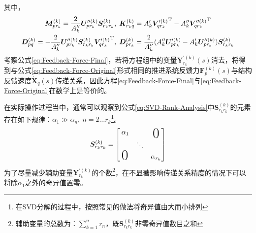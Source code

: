 其中，
\begin{displaymath}
	\begin{aligned}
		 \boldsymbol{M}_{pr_k}^{(k)}=\frac{2}{A''_k} \boldsymbol{U}_{pr_k}^{\prime\prime(k)} \boldsymbol{S}_{r_kr_k}^{(k)} &, \; \boldsymbol{K}_{r_kq}^{(k)}= {A'_k} {\boldsymbol{V}_{qr_k}^{\prime(k)}}^{\mathrm{T}}- {A''_k}{\boldsymbol{V}_{qr_k}^{\prime\prime(k)}}^{\mathrm{T}} \\ 
		 \boldsymbol{D}_{pq}^{(k)}=-\frac{2}{A''_k} \boldsymbol{U}_{pr_k}^{\prime\prime(k)} \boldsymbol{S}_{r_kr_k}^{(k)} {\boldsymbol{V}_{qr_k}^{\prime(k)}}^{\mathrm{T}} &, \; \boldsymbol{D}_{pr_k}^{(k)}=\frac{2}{A''_k}(A''_{k}\boldsymbol{U}_{pr_k}^{\prime(k)}- {A'_k}\boldsymbol{U}_{pr_k}^{\prime\prime(k)})\boldsymbol{S}_{r_kr_k}^{(k)}
	\end{aligned}
\end{displaymath}
考察公式\eqref{eq:Feedback-Force-Final}，若将方程组中的变量$\boldsymbol{Y}_{r_k}^{\prime(k)}(s)$消去，将得到与公式\eqref{eq:Feedback-Force-Original}形式相同的推进系统反馈力$\boldsymbol{F}_p^{(k)}(s)$与结构反馈速度$\dot{\boldsymbol{X}}_q(s)$传递关系，因此方程\eqref{eq:Feedback-Force-Final}与\eqref{eq:Feedback-Force-Original}在数学上是等价的。

在实际操作过程当中，通常可以观察到公式\eqref{eq:SVD-Rank-Analysis}中$\boldsymbol{S}_{r_kr_k}^{(k)}$的元素存在如下规律：$\alpha_1\gg\alpha_n,\ n=2\dots r_k$\footnote{在SVD分解的过程中，按照常见的做法将奇异值由大而小排列}。
\begin{displaymath}
	\boldsymbol{S}_{r_kr_k}^{(k)}= \begin{bmatrix}
	\rule{2pt}{0ex}\alpha_1 & & \text{\raisebox{-1.2ex}{\makebox[0pt][c]{\huge0}}}\\[0em]
	         &\ddots & \\[0em]
	\text{\rule{1pt}{0ex}\raisebox{-0.4ex}{\makebox[0pt][c]{\huge0}}} & & \alpha_{r_k}\\[0em]
	\end{bmatrix}
\end{displaymath}
为了尽量减少辅助变量$\boldsymbol{Y}_{r_k}^{\prime(k)}$的个数\footnote{辅助变量的总数为：$\sum_{k=1}^n r_n$，既$\boldsymbol{S}_{r_kr_k}^{(k)}$非零奇异值数目之和}，在不显著影响传递关系精度的情况下可以将除$\alpha_1$之外的奇异值置零。

